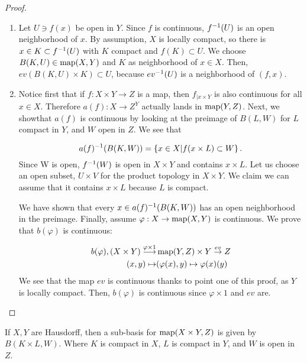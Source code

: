\documentclass[main.tex]{subfiles}
\begin{document}
\begin{proof}


\begin{enumerate}
		\item Let \(U \ni f(x)\) be open in \(Y\). Since \(f\) is continuous, \(f^{-1}(U)\) is an open neighborhood of \(x\).
		 By assumption, \(X\) is locally compact, so there is \(x \in K \subset f^{-1}(U)\) with \(K\) compact and \(f(K) \subset U\).
		 We choose \(B(K,U) \in \operatorname{map}(X,Y)\) and \(K\) as neighborhood of \(x \in X\).
		 Then, \(ev(B(K,U) \times K) \subset U\), because \(ev^{-1}(U)\) is a neighborhood of \((f,x)\).

		\item Notice first that if \(f: X \times Y \to Z\) is a map, then \(f_{|x \times Y}\) is also continuous for all \(x \in X\).
		 Therefore \(a(f): X \to Z^Y \) actually lands in \(\operatorname{map}(Y,Z)\).
		 Next, we showthat \(a(f)\) is continuous by looking at the preimage of \(B(L,W)\) for \(L\) compact in \(Y\), and \(W\) open in \(Z\).
		 We see that

\[
			 a(f)\inv (B(K,W)) = \mset{x \in X | f(x \times L) \subset W}.

\]
		 Since W is open, \(f^{-1}(W)\) is open in \(X \times Y\) and contains \(x \times L\).
		 Let us choose an open subset, \(U \times V\) for the product topology in \(X \times Y\).
		 We claim we can assume that it contains \(x \times L\) because \(L\) is compact.

		 We have shown that every \(x \in a(f)^{-1} (B(K,W))\) has an open neighborhood in the preimage.
		 Finally, assume \(\varphi: X \to \operatorname{map}(X,Y)\) is continuous.
		 We prove that \(b(\varphi)\) is continuous:


\begin{align*}
			 b(\varphi), (X \times Y) \stackrel{\varphi \times 1}{\longrightarrow} & \map(Y,Z) \times Y \stackrel{ev}{\to} Z \\
			 (x,y) \mapsto & (\varphi(x), y) \mapsto \varphi(x)(y)

\end{align*}
		 We see that the map \(ev\) is continuous thanks to point one of this proof, as \(Y\) is locally compact.
		 Then, \(b(\varphi)\) is continuous since \(\varphi \times 1\) and \(ev\) are.


\end{enumerate}
\end{proof}

\begin{lemma}
	If \(X,Y\) are Hausdorff, then a sub-basis for \(\operatorname{map}(X \times Y, Z)\) is given by \(B(K \times L, W)\).
	Where \(K\) is compact in \(X\), \(L\) is compact in \(Y\), and \(W\) is open in \(Z\).
\end{lemma}
\end{document}
